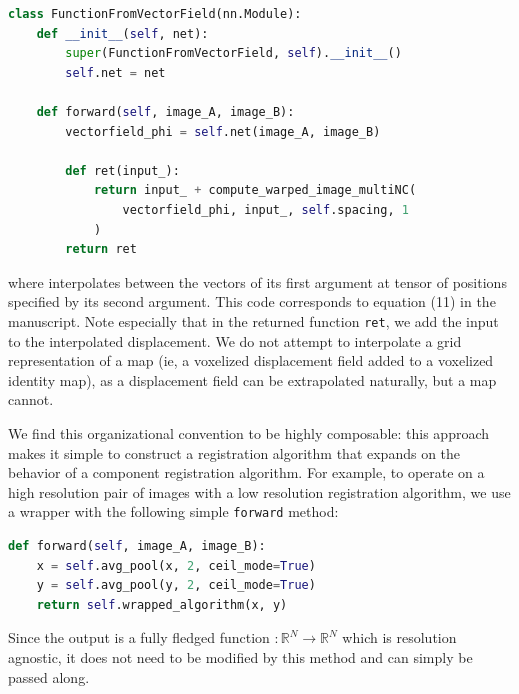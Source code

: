 \documentclass[10pt,onecolumn,letterpaper]{article} %
\begin{document}
\begin{lstlisting}[language=Python]
class FunctionFromVectorField(nn.Module):
    def __init__(self, net):
        super(FunctionFromVectorField, self).__init__()
        self.net = net

    def forward(self, image_A, image_B):
        vectorfield_phi = self.net(image_A, image_B)

        def ret(input_):
            return input_ + compute_warped_image_multiNC(
                vectorfield_phi, input_, self.spacing, 1
            )
        return ret
\end{lstlisting}
where  interpolates between the vectors of its first argument at tensor of positions specified by its second argument.
This code corresponds to equation (11) in the manuscript. Note especially that in the returned function \verb|ret|, we add the input to the interpolated displacement. We do not attempt to interpolate a grid representation of a map (ie, a voxelized displacement field added to a voxelized identity map), as a displacement field can be extrapolated naturally, but a map cannot.   

We find this organizational convention to be highly composable: this approach makes it simple to construct a registration algorithm that expands on the behavior of a component registration algorithm. For example, to operate on a high resolution pair of images with a low resolution registration algorithm, we use a wrapper with the following simple \verb|forward| method:

\begin{lstlisting}[language=Python]
def forward(self, image_A, image_B):
    x = self.avg_pool(x, 2, ceil_mode=True)
    y = self.avg_pool(y, 2, ceil_mode=True)
    return self.wrapped_algorithm(x, y)
\end{lstlisting}
Since the output is a fully fledged function $:\mathbb{R}^N \rightarrow \mathbb{R}^N$ which is resolution agnostic, it does not need to be modified by this method and can simply be passed along.
\end{document}
